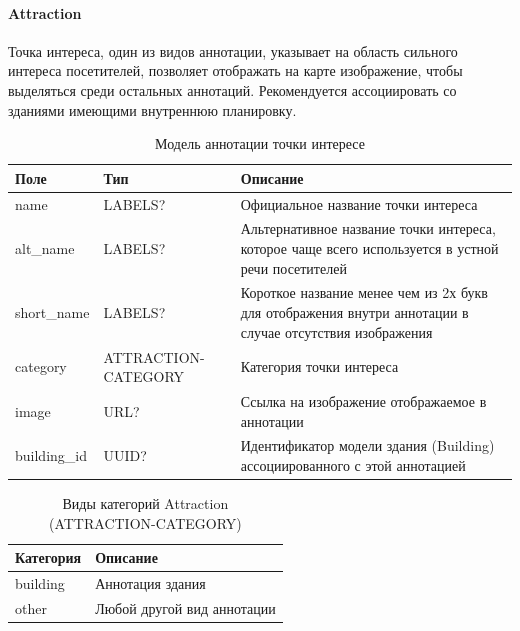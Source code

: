       \paragraph{Attraction}
        Точка интереса, один из видов аннотации, указывает на область сильного интереса посетителей, позволяет отображать на карте изображение, чтобы выделяться среди остальных аннотаций. Рекомендуется ассоциировать со зданиями имеющими внутреннюю планировку.
        \begin{center}
          \begin{xltabular}{\linewidth}{|l|p{4cm}|X|}
            \caption{Модель аннотации точки интересе}\\\hline
            Поле        & Тип                 & Описание                                                                                                \\ \hline
            name        & LABELS?             & Официальное название точки интереса                                                                     \\ \hline
            alt\_name   & LABELS?             & Альтернативное название точки интереса, которое чаще всего используется в устной речи посетителей       \\ \hline
            short\_name & LABELS?             & Короткое название менее чем из 2х букв для отображения внутри аннотации в случае отсутствия изображения \\ \hline
            category    & ATTRACTION-CATEGORY & Категория точки интереса                                                                                \\ \hline
            image       & URL?                & Ссылка на изображение отображаемое в аннотации                                                          \\ \hline
            building\_id& UUID?               & Идентификатор модели здания (Building) ассоциированного с этой аннотацией                               \\ \hline
          \end{xltabular}
        \end{center}
        \begin{center}
          \begin{xltabular}{\linewidth}{|l|X|}
            \caption{Виды категорий Attraction (ATTRACTION-CATEGORY)}\\           \hline
            Категория & Описание                   \\ \hline
            building  & Аннотация здания           \\ \hline
            other     & Любой другой вид аннотации \\ \hline
          \end{xltabular}
        \end{center}

